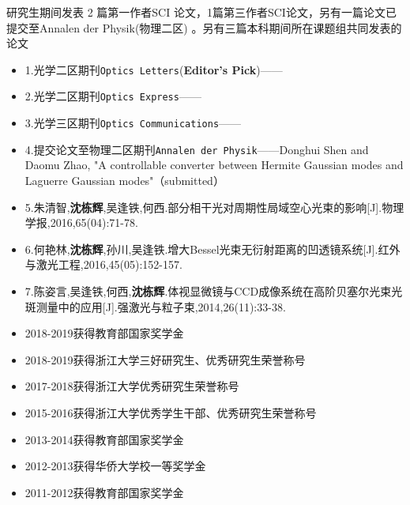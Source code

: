 \documentclass[zh]{resume}
\begin{document}
研究生期间发表 2 篇第一作者SCI 论文，1篇第三作者SCI论文，另有一篇论文已提交至Annalen der Physik(物理二区)
。另有三篇本科期间所在课题组共同发表的论文
\begin{itemize}
  \item 1.光学二区期刊\texttt{Optics Letters}(\textbf{Editor's Pick})——
  \item 2.光学二区期刊\texttt{Optics Express}——
  \item 3.光学三区期刊\texttt{Optics Communications}——
  \item 4.提交论文至物理二区期刊\texttt{Annalen der Physik}——{Donghui Shen and Daomu Zhao, "A controllable converter between Hermite Gaussian modes and Laguerre Gaussian modes"（submitted）}
  \item 5.朱清智,\textbf{沈栋辉},吴逢铁,何西.部分相干光对周期性局域空心光束的影响[J].物理学报,2016,65(04):71-78.
  \item 6.何艳林,\textbf{沈栋辉},孙川,吴逢铁.增大Bessel光束无衍射距离的凹透镜系统[J].红外与激光工程,2016,45(05):152-157.
  \item 7.陈姿言,吴逢铁,何西,\textbf{沈栋辉}.体视显微镜与CCD成像系统在高阶贝塞尔光束光斑测量中的应用[J].强激光与粒子束,2014,26(11):33-38.
\end{itemize}

\begin{itemize}
  \item 2018-2019获得教育部国家奖学金
  \item 2018-2019获得浙江大学三好研究生、优秀研究生荣誉称号
  \item 2017-2018获得浙江大学优秀研究生荣誉称号
  \item 2015-2016获得浙江大学优秀学生干部、优秀研究生荣誉称号
  \item 2013-2014获得教育部国家奖学金
  \item 2012-2013获得华侨大学校一等奖学金
  \item 2011-2012获得教育部国家奖学金
  
\end{itemize}
\end{document}
